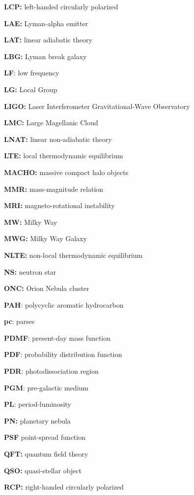 \documentclass[a4paper,10pt]{article}
\begin{document}
{\noindent}\textbf{LCP:} left-handed circularly polarized

{\noindent}\textbf{LAE:} Lyman-alpha emitter

{\noindent}\textbf{LAT:} linear adiabatic theory

{\noindent}\textbf{LBG:} Lyman break galaxy

{\noindent}\textbf{LF}: low frequency

{\noindent}\textbf{LG:} Local Group

{\noindent}\textbf{LIGO:} Laser Interferometer Gravitational-Wave Observatory

{\noindent}\textbf{LMC:} Large Magellanic Cloud

{\noindent}\textbf{LNAT:} linear non-adiabatic theory

{\noindent}\textbf{LTE:} local thermodynamic equilibrium

{\noindent}\textbf{MACHO:} massive compact halo objects

{\noindent}\textbf{MMR:} mass-magnitude relation

{\noindent}\textbf{MRI:} magneto-rotational instability

{\noindent}\textbf{MW:} Milky Way

{\noindent}\textbf{MWG:} Milky Way Galaxy

{\noindent}\textbf{NLTE:} non-local thermodynamic equilibrium

{\noindent}\textbf{NS:} neutron star

{\noindent}\textbf{ONC:} Orion Nebula cluster

{\noindent}\textbf{PAH}: polycyclic aromatic hydrocarbon

{\noindent}\textbf{pc}: parsec

{\noindent}\textbf{PDMF}: present-day mass function

{\noindent}\textbf{PDF}: probability distribution function

{\noindent}\textbf{PDR}: photodissociation region

{\noindent}\textbf{PGM}: pre-galactic medium

{\noindent}\textbf{PL}: period-luminosity

{\noindent}\textbf{PN:} planetary nebula

{\noindent}\textbf{PSF} point-spread function

{\noindent}\textbf{QFT:} quantum field theory

{\noindent}\textbf{QSO:} quasi-stellar object

{\noindent}\textbf{RCP:} right-handed circularly polarized
\end{document}
